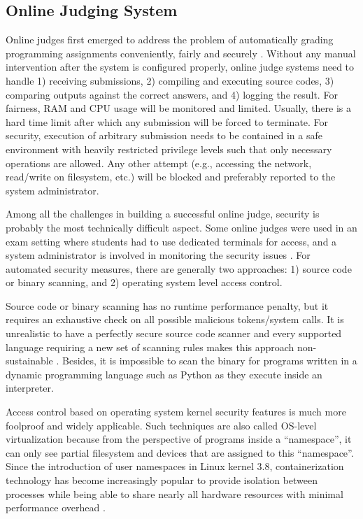 \subsection{Online Judging System}
Online judges first emerged to address the problem of automatically grading programming assignments conveniently, fairly and securely \parencite{RN4}. Without any manual intervention after the system is configured properly, online judge systems need to handle 1) receiving submissions, 2) compiling and executing source codes, 3) comparing outputs against the correct answers, and 4) logging the result. For fairness, RAM and CPU usage will be monitored and limited. Usually, there is a hard time limit after which any submission will be forced to terminate. For security, execution of arbitrary submission needs to be contained in a safe environment with heavily restricted privilege levels such that only necessary operations are allowed. Any other attempt (e.g., accessing the network, read/write on filesystem, etc.) will be blocked and preferably reported to the system administrator. 

Among all the challenges in building a successful online judge, security is probably the most technically difficult aspect. Some online judges were used in an exam setting where students had to use dedicated terminals for access, and a system administrator is involved in monitoring the security issues \parencite{10.1145/384267.305835}. For automated security measures, there are generally two approaches: 1) source code or binary scanning, and 2) operating system level access control. 

Source code or binary scanning has no runtime performance penalty, but it requires an exhaustive check on all possible malicious tokens/system calls. It is unrealistic to have a perfectly secure source code scanner and every supported language requiring a new set of scanning rules makes this approach non-sustainable \parencite{RN4}. Besides, it is impossible to scan the binary for programs written in a dynamic programming language such as Python as they execute inside an interpreter.

Access control based on operating system kernel security features is much more foolproof and widely applicable. Such techniques are also called OS-level virtualization because from the perspective of programs inside a ``namespace'', it can only see partial filesystem and devices that are assigned to this ``namespace''. Since the introduction of user namespaces in Linux kernel 3.8, containerization technology has become increasingly popular to provide isolation between processes while being able to share nearly all hardware resources with minimal performance overhead \parencite{RN16}. 

